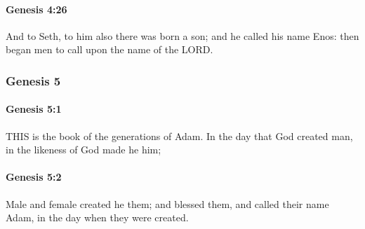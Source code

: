 		\paragraph{Genesis 4:26} %
			\label{GENESIS-4-26}

			And to Seth, to him also there was born a son; and he called his name Enos: then began men to call upon the name of the LORD.


	\subsubsection{Genesis 5} %
		\label{GENESIS-5}
		
		\paragraph{Genesis 5:1} %
			\label{GENESIS-5-1}

			THIS is the book of the generations of Adam.  In the day that God created man, in the likeness of God made he him;


		\paragraph{Genesis 5:2} %
			\label{GENESIS-5-2}

			Male and female created he them; and blessed them, and called their name Adam, in the day when they were created.


